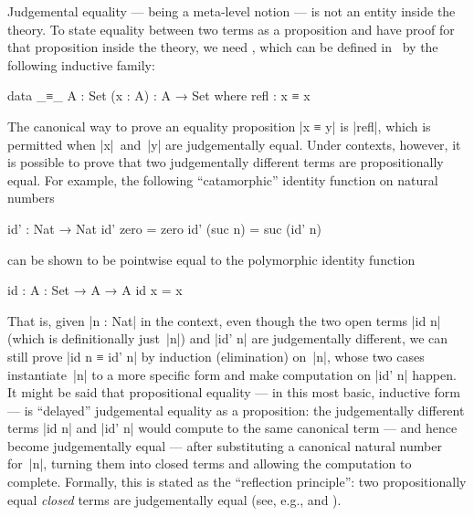 Judgemental equality --- being a meta-level notion --- is not an entity inside the theory.
To state equality between two terms as a proposition and have proof for that proposition inside the theory, we need , which can be defined in \Agda\ by the following inductive family:
\begin{code}
data _≡_ {A : Set} (x : A) : A → Set where
  refl : x ≡ x
\end{code}
The canonical way to prove an equality proposition |x ≡ y| is |refl|, which is permitted when |x|~and~|y| are judgementally equal.
Under contexts, however, it is possible to prove that two judgementally different terms are propositionally equal.
For example, the following ``catamorphic'' identity function on natural numbers
\begin{code}
id' : Nat → Nat
id' zero     = zero
id' (suc n)  = suc (id' n)
\end{code}
can be shown to be pointwise equal to the polymorphic identity function
\begin{code}
id : {A : Set} → A → A
id x = x
\end{code}
That is, given |n : Nat| in the context, even though the two open terms |id n| (which is definitionally just~|n|) and |id' n| are judgementally different, we can still prove |id n ≡ id' n| by induction (elimination) on~|n|, whose two cases instantiate~|n| to a more specific form and make computation on |id' n| happen.
It might be said that propositional equality --- in this most basic, inductive form --- is ``delayed'' judgemental equality as a proposition:
the judgementally different terms |id n| and |id' n| would compute to the same canonical term --- and hence become judgementally equal --- after substituting a canonical natural number for~|n|, turning them into closed terms and allowing the computation to complete.
Formally, this is stated as the ``reflection principle'': two propositionally equal \emph{closed} terms are judgementally equal (see, e.g., \citet[Section~5.1.3]{Luo-type-theory} and \citet[Section~1.1]{Streicher-ITT}).

